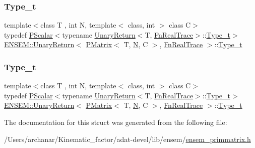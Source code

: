 \subsubsection{\texorpdfstring{Type\_t}{Type\_t}\hspace{0.1cm}{\footnotesize\ttfamily [2/3]}}
{\footnotesize\ttfamily template$<$class T , int N, template$<$ class, int $>$ class C$>$ \\
typedef \mbox{\hyperlink{classENSEM_1_1PScalar}{P\+Scalar}}$<$typename \mbox{\hyperlink{structENSEM_1_1UnaryReturn}{Unary\+Return}}$<$T, \mbox{\hyperlink{structENSEM_1_1FnRealTrace}{Fn\+Real\+Trace}}$>$\+::\mbox{\hyperlink{structENSEM_1_1UnaryReturn_3_01PMatrix_3_01T_00_01N_00_01C_01_4_00_01FnRealTrace_01_4_a22a5a3f850fb258f3825c3a6f84a3259}{Type\+\_\+t}}$>$ \mbox{\hyperlink{structENSEM_1_1UnaryReturn}{E\+N\+S\+E\+M\+::\+Unary\+Return}}$<$ \mbox{\hyperlink{classENSEM_1_1PMatrix}{P\+Matrix}}$<$ T, \mbox{\hyperlink{adat__devel_2lib_2hadron_2operator__name__util_8cc_a7722c8ecbb62d99aee7ce68b1752f337}{N}}, C $>$, \mbox{\hyperlink{structENSEM_1_1FnRealTrace}{Fn\+Real\+Trace}} $>$\+::\mbox{\hyperlink{structENSEM_1_1UnaryReturn_3_01PMatrix_3_01T_00_01N_00_01C_01_4_00_01FnRealTrace_01_4_a22a5a3f850fb258f3825c3a6f84a3259}{Type\+\_\+t}}}

\mbox{\label{structENSEM_1_1UnaryReturn_3_01PMatrix_3_01T_00_01N_00_01C_01_4_00_01FnRealTrace_01_4_a22a5a3f850fb258f3825c3a6f84a3259}} 
\subsubsection{\texorpdfstring{Type\_t}{Type\_t}\hspace{0.1cm}{\footnotesize\ttfamily [3/3]}}
{\footnotesize\ttfamily template$<$class T , int N, template$<$ class, int $>$ class C$>$ \\
typedef \mbox{\hyperlink{classENSEM_1_1PScalar}{P\+Scalar}}$<$typename \mbox{\hyperlink{structENSEM_1_1UnaryReturn}{Unary\+Return}}$<$T, \mbox{\hyperlink{structENSEM_1_1FnRealTrace}{Fn\+Real\+Trace}}$>$\+::\mbox{\hyperlink{structENSEM_1_1UnaryReturn_3_01PMatrix_3_01T_00_01N_00_01C_01_4_00_01FnRealTrace_01_4_a22a5a3f850fb258f3825c3a6f84a3259}{Type\+\_\+t}}$>$ \mbox{\hyperlink{structENSEM_1_1UnaryReturn}{E\+N\+S\+E\+M\+::\+Unary\+Return}}$<$ \mbox{\hyperlink{classENSEM_1_1PMatrix}{P\+Matrix}}$<$ T, \mbox{\hyperlink{adat__devel_2lib_2hadron_2operator__name__util_8cc_a7722c8ecbb62d99aee7ce68b1752f337}{N}}, C $>$, \mbox{\hyperlink{structENSEM_1_1FnRealTrace}{Fn\+Real\+Trace}} $>$\+::\mbox{\hyperlink{structENSEM_1_1UnaryReturn_3_01PMatrix_3_01T_00_01N_00_01C_01_4_00_01FnRealTrace_01_4_a22a5a3f850fb258f3825c3a6f84a3259}{Type\+\_\+t}}}



The documentation for this struct was generated from the following file\+:\begin{DoxyCompactItemize}
\item 
/\+Users/archanar/\+Kinematic\+\_\+factor/adat-\/devel/lib/ensem/\mbox{\hyperlink{adat-devel_2lib_2ensem_2ensem__primmatrix_8h}{ensem\+\_\+primmatrix.\+h}}\end{DoxyCompactItemize}
